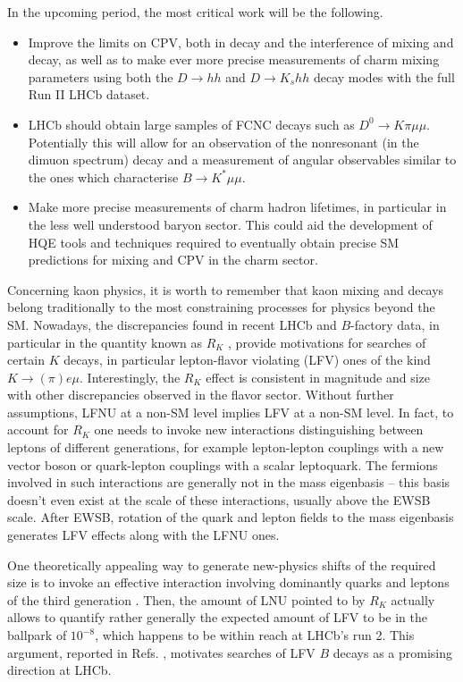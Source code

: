 In the upcoming period, the most critical work will be the following.
\begin{itemize}
\item Improve the limits on CPV, both in decay and the interference of mixing and decay, as well as to make ever more precise measurements of charm mixing parameters using both the $D\to hh$ and $D\to K_s hh$ decay modes with the full Run II LHCb dataset. \item LHCb should obtain large samples of FCNC decays such as $D^0\to K \pi\mu\mu$.  Potentially this will allow for an observation of the nonresonant (in the dimuon spectrum) decay and a measurement of angular observables similar to the ones which characterise $B\to K^*\mu\mu$. 
\item Make more precise measurements of charm hadron lifetimes, in particular in the less well understood baryon sector. This could aid the development of HQE tools and techniques required to eventually obtain precise SM predictions for mixing and CPV in the charm sector.
\end{itemize}

Concerning kaon physics, it is worth to remember that kaon mixing and decays belong traditionally to the most constraining processes for physics beyond the SM. Nowadays, the discrepancies found in recent LHCb and $B$-factory data, in particular in the quantity known as $R_K$ \cite{Aaij:2014ora},  provide motivations for searches of certain $K$ decays, in particular lepton-flavor violating (LFV) ones of the kind $K \to (\pi) e \mu$.  Interestingly, the $R_K$ effect is consistent in magnitude and size with other discrepancies observed in the flavor sector. Without further assumptions, LFNU at a non-SM level implies LFV at a non-SM level. In fact, to account for $R_K$ one needs to invoke new interactions distinguishing between leptons of different generations, for example lepton-lepton couplings with a new vector boson or quark-lepton couplings with a scalar leptoquark. The fermions involved in such interactions are generally not in the mass eigenbasis -- this basis doesn't even exist at the scale of these interactions, usually above the EWSB scale. After EWSB, rotation of the quark and lepton fields to the mass eigenbasis generates LFV effects along with the LFNU ones.

One theoretically appealing way to generate new-physics shifts of the required size is to invoke an effective interaction involving dominantly quarks and leptons of the third generation \cite{Glashow:2014iga}. Then, the amount of LNU pointed to by $R_K$ actually allows to quantify rather generally the expected amount of LFV to be in the ballpark of $10^{-8}$, which happens to be within reach at LHCb's run 2. This argument, reported in Refs. \cite{Guadagnoli:2016erb,Glashow:2014iga}, motivates searches of LFV $B$ decays as a promising direction at LHCb.

